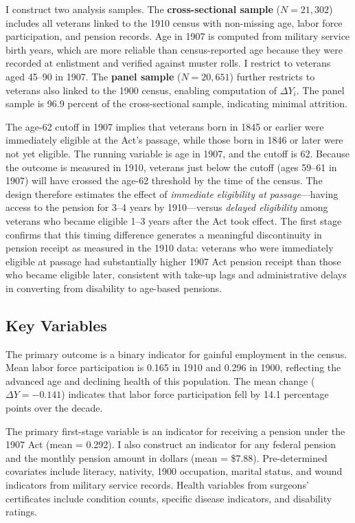 \documentclass[12pt]{article}
\begin{document}
I construct two analysis samples. The \textbf{cross-sectional sample} ($N = 21{,}302$) includes all veterans linked to the 1910 census with non-missing age, labor force participation, and pension records. Age in 1907 is computed from military service birth years, which are more reliable than census-reported age because they were recorded at enlistment and verified against muster rolls. I restrict to veterans aged 45--90 in 1907. The \textbf{panel sample} ($N = 20{,}651$) further restricts to veterans also linked to the 1900 census, enabling computation of $\Delta Y_i$. The panel sample is 96.9 percent of the cross-sectional sample, indicating minimal attrition.

The age-62 cutoff in 1907 implies that veterans born in 1845 or earlier were immediately eligible at the Act's passage, while those born in 1846 or later were not yet eligible. The running variable is age in 1907, and the cutoff is 62. Because the outcome is measured in 1910, veterans just below the cutoff (ages 59--61 in 1907) will have crossed the age-62 threshold by the time of the census. The design therefore estimates the effect of \textit{immediate eligibility at passage}---having access to the pension for 3--4 years by 1910---versus \textit{delayed eligibility} among veterans who became eligible 1--3 years after the Act took effect. The first stage confirms that this timing difference generates a meaningful discontinuity in pension receipt as measured in the 1910 data: veterans who were immediately eligible at passage had substantially higher 1907 Act pension receipt than those who became eligible later, consistent with take-up lags and administrative delays in converting from disability to age-based pensions.

\subsection{Key Variables}

The primary outcome is a binary indicator for gainful employment in the census. Mean labor force participation is 0.165 in 1910 and 0.296 in 1900, reflecting the advanced age and declining health of this population. The mean change ($\Delta Y = -0.141$) indicates that labor force participation fell by 14.1 percentage points over the decade.

The primary first-stage variable is an indicator for receiving a pension under the 1907 Act (mean = 0.292). I also construct an indicator for any federal pension and the monthly pension amount in dollars (mean = \$7.88). Pre-determined covariates include literacy, nativity, 1900 occupation, marital status, and wound indicators from military service records. Health variables from surgeons' certificates include condition counts, specific disease indicators, and disability ratings.
\end{document}
